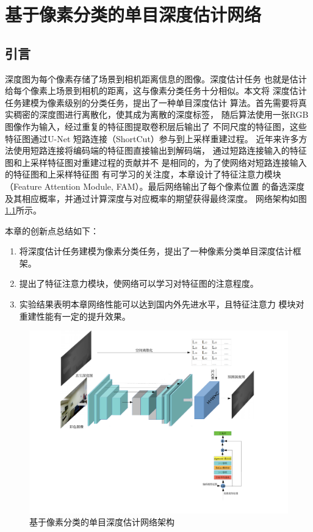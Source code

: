 \chapter{基于像素分类的单目深度估计网络}
\section{引言}
深度图为每个像素存储了场景到相机距离信息的图像。深度估计任务
也就是估计给每个像素上场景到相机的距离，这与像素分类任务十分相似。本文将
深度估计任务建模为像素级别的分类任务，提出了一种单目深度估计
算法。首先需要将真实稠密的深度图进行离散化，使其成为离散的深度标签，
随后算法使用一张RGB图像作为输入，经过重复的特征图提取卷积层后输出了
不同尺度的特征图，这些特征图通过U-Net\cite{unet}
短路连接（ShortCut）参与到上采样重建过程。
近年来许多方法使用短路连接将编码端的特征图直接输出到解码端，
通过短路连接输入的特征图和上采样特征图对重建过程的贡献并不
是相同的，为了使网络对短路连接输入的特征图和上采样特征图
有可学习的关注度，本章设计了特征注意力模块（Feature
Attention Module, FAM）。最后网络输出了每个像素位置
的备选深度及其相应概率，并通过计算深度与对应概率的期望获得最终深度。
网络架构如图\ref{Stream of class}所示。

本章的创新点总结如下：
\begin{enumerate}
  \item 将深度估计任务建模为像素分类任务，提出了一种像素分类单目深度估计框架。
  \item 提出了特征注意力模块，使网络可以学习对特征图的注意程度。
  \item 实验结果表明本章网络性能可以达到国内外先进水平，且特征注意力
  模块对重建性能有一定的提升效果。
\end{enumerate}
\begin{figure}[htb]
    \centering
    \includegraphics[width=0.9\linewidth]{figure/Stream_of_class.pdf}
    \caption{基于像素分类的单目深度估计网络架构\cite{pm}}
    \label{Stream of class}
\end{figure}
